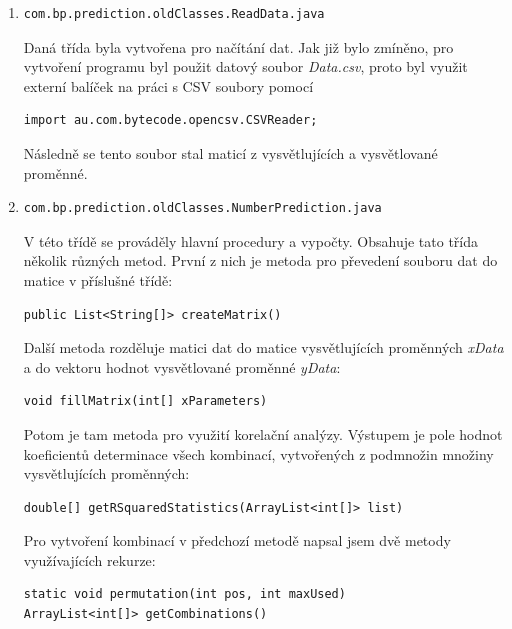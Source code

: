 \documentclass[a4paper,12pt,twoside]{scrreprt}
\begin{document}
\begin{enumerate}
\item \begin{lstlisting}
com.bp.prediction.oldClasses.ReadData.java
\end{lstlisting}

Daná třída byla vytvořena pro načítání dat. Jak již bylo zmíněno, pro vytvoření programu byl použit datový soubor \textit{Data.csv}, proto byl využit externí balíček na práci s CSV soubory pomocí

\begin{lstlisting}
import au.com.bytecode.opencsv.CSVReader;
\end{lstlisting}

Následně se tento soubor stal maticí z vysvětlujících a vysvětlované proměnné. 

\item \begin{lstlisting}
com.bp.prediction.oldClasses.NumberPrediction.java
\end{lstlisting}

V této třídě se prováděly hlavní procedury a vypočty. Obsahuje tato třída několik různých metod. 
První z nich je metoda pro převedení souboru dat do matice v příslušné třídě:

\begin{lstlisting}
public List<String[]> createMatrix()
\end{lstlisting}

Další metoda rozděluje matici dat do matice vysvětlujících proměnných \textit{xData} a do vektoru hodnot vysvětlované proměnné \textit{yData}:

\begin{lstlisting}
void fillMatrix(int[] xParameters) 
\end{lstlisting}

Potom je tam metoda pro využití korelační analýzy. Výstupem je pole hodnot koeficientů determinace všech kombinací, vytvořených z podmnožin množiny vysvětlujících proměnných:

\begin{lstlisting}
double[] getRSquaredStatistics(ArrayList<int[]> list)
\end{lstlisting}

Pro vytvoření kombinací v předchozí metodě napsal jsem dvě metody využívajících rekurze:

\begin{lstlisting}
static void permutation(int pos, int maxUsed) 
ArrayList<int[]> getCombinations() 
\end{lstlisting}


\end{enumerate}
\end{document}
